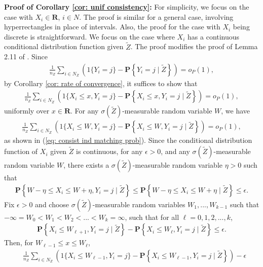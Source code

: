 \documentclass[12pt, fullpage]{amsart}
\theoremstyle{definition}
\theoremstyle{definition}
\theoremstyle{definition}
\begin{document}
\begin{bibunit}[econometrica]
\noindent \textbf{Proof of Corollary \ref{cor: unif consistency}: } For simplicity, we focus on the case with $X_i \in \mathbf{R}$, $i \in N$. The proof is similar for a general case, involving hyperrectangles in place of intervals. Also, the proof for the case with $X_i$ being discrete is straightforward. We focus on the case where $X_i$ has a continuous conditional distribution function given $\tilde Z$. The proof modifies the proof of Lemma 2.11 of \cite{vanderVaart:98:AsympStat}. Since 
\begin{align*}
	\frac{1}{n_Z} \sum_{i \in N_Z} \left( 1\{Y_i = j\} - \mathbf{P}\left\{Y_i = j \mid \tilde Z\right\} \right) = o_P(1),
\end{align*}
 by Corollary \ref{cor: rate of convergence}, it suffices to show that
\begin{align}
	\label{conv32}
	\frac{1}{n_Z} \sum_{i \in N_Z} \left( 1\{X_i \le x, Y_i = j\} - \mathbf{P}\left\{X_i \le x, Y_i = j \mid \tilde Z\right\} \right) = o_P(1),
\end{align}
uniformly over $x \in \mathbf{R}$. For any $\sigma(\tilde Z)$-measurable random variable $W$, we have
\begin{align}
	\label{op}
	\frac{1}{n_Z} \sum_{i \in N_Z}  \left( 1\{X_i \le W, Y_i = j\} - \mathbf{P}\left\{X_i \le W, Y_i = j \mid \tilde Z\right\} \right) = o_P(1),
\end{align}
as shown in (\ref{eq: consist ind matching prob}). Since the conditional distribution function of $X_i$ given $\tilde Z$ is continuous, for any $\epsilon>0$, and any $\sigma(\tilde Z)$-measurable random variable $W$, there exists a $\sigma(\tilde Z)$-measurable random variable $\eta>0$ such that
\begin{align*}
	\mathbf{P}\left\{ W - \eta \le X_i \le W + \eta, Y_i = j  \mid \tilde Z \right\} \le \mathbf{P}\left\{ W - \eta \le X_i \le W + \eta \mid \tilde Z \right\} \le \epsilon.
\end{align*}
Fix $\epsilon>0$ and choose $\sigma(\tilde Z)$-measurable random variables $W_1,...,W_{k-1}$ such that $-\infty = W_0 < W_1 < W_2 < ... < W_k = \infty$, such that for all $\ell = 0,1,2,...,k$,
\begin{align*}
	\mathbf{P}\left\{X_i \le W_{\ell+1}, Y_i = j \mid \tilde Z \right\} - \mathbf{P}\left\{X_i \le W_{\ell}, Y_i = j \mid \tilde Z \right\} \le \epsilon.
\end{align*}
Then, for $W_{\ell-1} \le x \le W_{\ell}$, 
\begin{align*}
	&\frac{1}{n_Z} \sum_{i \in N_Z}  \left( 1\{X_i \le W_{\ell-1}, Y_i = j\} - \mathbf{P}\left\{X_i \le W_{\ell-1}, Y_i = j \mid \tilde Z\right\} \right) - \epsilon\\

\end{align*}
\end{bibunit}
\end{document}
